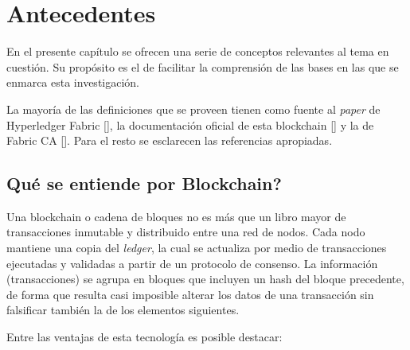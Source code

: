 \chapter{Antecedentes}\label{chapter:state-of-the-art}

En el presente cap\'itulo se ofrecen una serie de conceptos relevantes al tema en cuesti\'on. Su prop\'osito es el de facilitar la comprensi\'on de las bases en las que se enmarca esta investigaci\'on. %

La mayor\'ia de las definiciones que se proveen tienen como fuente al \emph{paper} de Hyperledger Fabric [\cite{androulaki2018hyperledger}], la documentaci\'on oficial de esta blockchain [\cite{hyperledgerorg}] y la de Fabric CA [\cite{fabricca}]. Para el resto se esclarecen las referencias apropiadas.%

\section{\textquestiondown Qu\'e se entiende por Blockchain?}

Una blockchain o cadena de bloques no es m\'as que un libro mayor de transacciones inmutable y distribuido entre una red de nodos. Cada nodo mantiene una copia del \emph{ledger}, la cual se actualiza por medio de transacciones ejecutadas y validadas a partir de un protocolo de consenso. La informaci\'on (transacciones) se agrupa en bloques que incluyen un hash del bloque precedente, de forma que resulta casi imposible alterar los datos de una transacci\'on sin falsificar tambi\'en la de los elementos siguientes.

Entre las ventajas de esta tecnolog\'ia es posible destacar:

